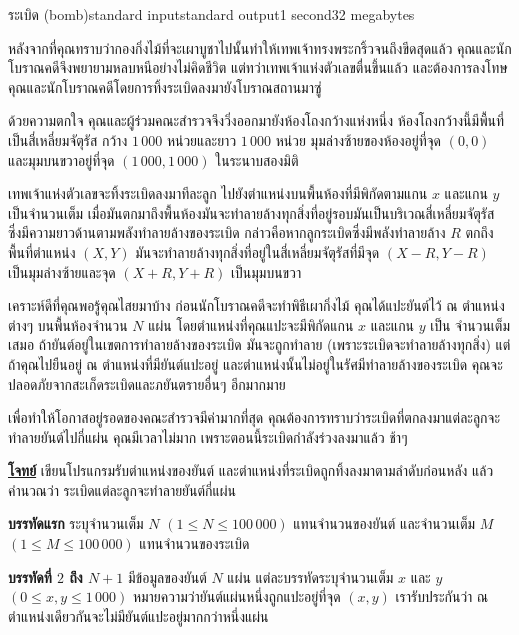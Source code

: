 \documentclass[11pt,a4paper]{article}
\begin{document}
\begin{problem}{ระเบิด (bomb)}{standard input}{standard output}{1 second}{32 megabytes}

หลังจากที่คุณทราบว่ากองกิ่งไม้ที่จะเผาบูชาไปนั้นทำให้เทพเจ้าทรงพระกริ้วจนถึงขีดสุดแล้ว คุณและนักโบราณคดีจึงพยายามหลบหนีอย่างไม่คิดชีวิต แต่ทว่าเทพเจ้าแห่งตัวเลขตื่นขึ้นแล้ว และต้องการลงโทษคุณและนักโบราณคดีโดยการทิ้งระเบิดลงมายังโบราณสถานมาซู่

ด้วยความตกใจ คุณและผู้ร่วมคณะสำรวจจึงวิ่งออกมายังห้องโถงกว้างแห่งหนึ่ง ห้องโถงกว้างนี้มีพื้นที่เป็นสี่เหลี่ยมจัตุรัส กว้าง $1\,000$ หน่วยและยาว $1\,000$ หน่วย มุมล่างซ้ายของห้องอยู่ที่จุด $(0, 0)$ และมุมบนขวาอยู่ที่จุด $(1\,000 , 1\,000)$ ในระนาบสองมิติ

    เทพเจ้าแห่งตัวเลขจะทิ้งระเบิดลงมาทีละลูก ไปยังตำแหน่งบนพื้นห้องที่มีพิกัดตามแกน $x$ และแกน $y$ เป็นจำนวนเต็ม เมื่อมันตกมาถึงพื้นห้องมันจะทำลายล้างทุกสิ่งที่อยู่รอบมันเป็นบริเวณสี่เหลี่ยมจัตุรัส ซึ่งมีความยาวด้านตามพลังทำลายล้างของระเบิด กล่าวคือหากลูกระเบิดซึ่งมีพลังทำลายล้าง $R$ ตกถึงพื้นที่ตำแหน่ง $(X, Y)$ มันจะทำลายล้างทุกสิ่งที่อยู่ในสี่เหลี่ยมจัตุรัสที่มีจุด $(X - R, Y - R)$ เป็นมุมล่างซ้ายและจุด $(X + R, Y + R)$ เป็นมุมบนขวา
    
    เคราะห์ดีที่คุณพอรู้คุณไสยมาบ้าง ก่อนนักโบราณคดีจะทำพิธีเผากิ่งไม้ คุณได้แปะยันต์ไว้ ณ ตำแหน่งต่างๆ บนพื้นห้องจำนวน $N$ แผ่น โดยตำแหน่งที่คุณแปะจะมีพิกัดแกน $x$ และแกน $y$ เป็น จำนวนเต็มเสมอ ถ้ายันต์อยู่ในเขตการทำลายล้างของระเบิด มันจะถูกทำลาย (เพราะระเบิดจะทำลายล้างทุกสิ่ง) แต่ถ้าคุณไปยืนอยู่ ณ ตำแหน่งที่มียันต์แปะอยู่ และตำแหน่งนั้นไม่อยู่ในรัศมีทำลายล้างของระเบิด คุณจะปลอดภัยจากสะเก็ดระเบิดและภยันตรายอื่นๆ อีกมากมาย
    
    เพื่อทำให้โอกาสอยู่รอดของคณะสำรวจมีค่ามากที่สุด คุณต้องการทราบว่าระเบิดที่ตกลงมาแต่ละลูกจะทำลายยันต์ไปกี่แผ่น คุณมีเวลาไม่มาก เพราะตอนนี้ระเบิดกำลังร่วงลงมาแล้ว ช้าๆ

\bigskip
\underline{\textbf{โจทย์}}  เขียนโปรแกรมรับตำแหน่งของยันต์ และตำแหน่งที่ระเบิดถูกทิ้งลงมาตามลำดับก่อนหลัง แล้วคำนวณว่า ระเบิดแต่ละลูกจะทำลายยันต์กี่แผ่น

\InputFile

\textbf{บรรทัดแรก} ระบุจำนวนเต็ม $N$ $(1 \leq N \leq 100\,000)$ แทนจำนวนของยันต์ และจำนวนเต็ม $M$ $(1 \leq M \leq 100\,000)$ แทนจำนวนของระเบิด

\textbf{บรรทัดที่ $2$ ถึง $N+1$} มีข้อมูลของยันต์ $N$ แผ่น แต่ละบรรทัดระบุจำนวนเต็ม $x$ และ $y$ $(0 \leq x, y \leq 1\,000)$ หมายความว่ายันต์แผ่นหนึ่งถูกแปะอยู่ที่จุด $(x, y)$ เรารับประกันว่า ณ ตำแหน่งเดียวกันจะไม่มียันต์แปะอยู่มากกว่าหนึ่งแผ่น


\end{problem}
\end{document}
